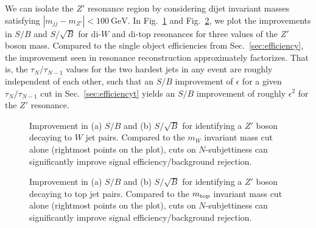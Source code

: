 \documentclass{JHEP3}
\newcommand{\vsh}{\vspace{-.5cm}}
\newcommand{\GeV}{\text{GeV}}
\DeclareRobustCommand{\Sec}[1]{Sec.~\ref{#1}}
\DeclareRobustCommand{\Fig}[1]{Fig.~\ref{#1}}
\begin{document}
We can isolate the $Z'$ resonance region by considering dijet invariant masses satisfying $|m_{jj} - m_{Z'}| < 100~\GeV$.  In \Fig{fig:ZprimeEffW} and \Fig{fig:ZprimeEff}, we plot the improvements in $S/B$ and $S/\sqrt{B}$ for di-$W$ and di-top resonances for three values of the $Z'$ boson mass.  Compared to the single object efficiencies from \Sec{sec:efficiency}, the improvement seen in resonance reconstruction approximately factorizes.  That is, the $\tau_{N}/\tau_{N-1}$ values for the two hardest jets in any event are roughly independent of each other, such that an $S/B$ improvement of $\epsilon$ for a given $\tau_{N}/\tau_{N-1}$ cut in \Sec{sec:efficiencyt} yields an $S/B$ improvement of roughly $\epsilon^2$ for the $Z'$ resonance. 


\begin{figure}[tp]
  \begin{center}
  \end{center}
  \vsh
  \caption{Improvement in (a) $S/B$ and (b) $S/\sqrt{B}$ for identifying a $Z'$ boson decaying to $W$ jet pairs.   Compared to the $m_W$ invariant mass cut alone (rightmost points on the plot), cuts on $N$-subjettiness can significantly improve signal efficiency/background rejection.}
  \label{fig:ZprimeEffW}
\end{figure}

\begin{figure}[tp]
  \begin{center}
  \end{center}
  \vsh
  \caption{Improvement in (a) $S/B$ and (b) $S/\sqrt{B}$ for identifying a $Z'$ boson decaying to top jet pairs.   Compared to the $m_{\rm top}$ invariant mass cut alone (rightmost points on the plot), cuts on $N$-subjettiness can significantly improve signal efficiency/background rejection.}
  \label{fig:ZprimeEff}
\end{figure}
\end{document}
